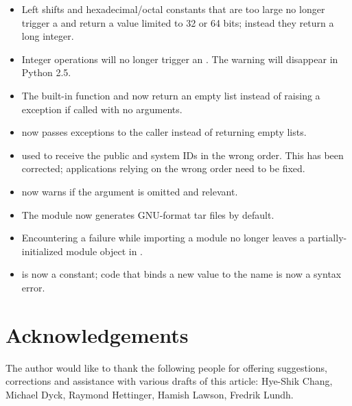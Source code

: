 \documentclass{howto}
\begin{document}
\begin{itemize}

\item Left shifts and hexadecimal/octal constants that are too 
  large no longer trigger a  and return 
  a value limited to 32 or 64 bits; instead they return a long integer.

\item Integer operations will no longer trigger an .
The  warning will disappear in Python 2.5.

\item The  built-in function and 
  now return  an empty list instead of raising a 
  exception if called with no arguments.

\item {} now passes exceptions to the caller
      instead of returning empty lists.

\item {} used to receive the public and
  system IDs in the wrong order.  This has been corrected; applications
  relying on the wrong order need to be fixed.

\item {} now warns if the  
 argument is omitted and relevant.

\item The  module now generates GNU-format tar files
by default.

\item Encountering a failure while importing a module no longer leaves
a partially-initialized module object in .  

\item {} is now a constant; code that binds a new value to 
the name  is now a syntax error.

\end{itemize}


\section{Acknowledgements \label{acks}}

The author would like to thank the following people for offering
suggestions, corrections and assistance with various drafts of this
article: Hye-Shik Chang, Michael Dyck, Raymond Hettinger, Hamish Lawson,
Fredrik Lundh.
\end{document}

